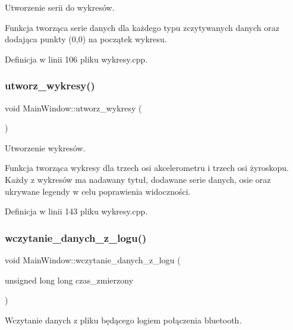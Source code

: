 Utworzenie serii do wykresów. 

Funkcja tworząca serie danych dla każdego typu zczytywanych danych oraz dodająca punkty (0,0) na początek wykresu. 

Definicja w linii 106 pliku wykresy.\+cpp.

\mbox{\label{class_main_window_a01486cea6f70518576b42f372c7fbf7a}} 
\subsubsection{\texorpdfstring{utworz\+\_\+wykresy()}{utworz\_wykresy()}}
{\footnotesize\ttfamily void Main\+Window\+::utworz\+\_\+wykresy (\begin{DoxyParamCaption}{ }\end{DoxyParamCaption})}



Utworzenie wykresów. 

Funkcja tworząca wykresy dla trzech osi akcelerometru i trzech osi żyroskopu. Każdy z wykresów ma nadawany tytuł, dodawane serie danych, osie oraz ukrywane legendy w celu poprawienia widoczności. 

Definicja w linii 143 pliku wykresy.\+cpp.

\mbox{\label{class_main_window_a5c39c76ab1f6edbff934e87a385bd5bd}} 
\subsubsection{\texorpdfstring{wczytanie\+\_\+danych\+\_\+z\+\_\+logu()}{wczytanie\_danych\_z\_logu()}}
{\footnotesize\ttfamily void Main\+Window\+::wczytanie\+\_\+danych\+\_\+z\+\_\+logu (\begin{DoxyParamCaption}\item[{unsigned long long}]{czas\+\_\+zmierzony }\end{DoxyParamCaption})}



Wczytanie danych z pliku będącego logiem połączenia bluetooth. 

